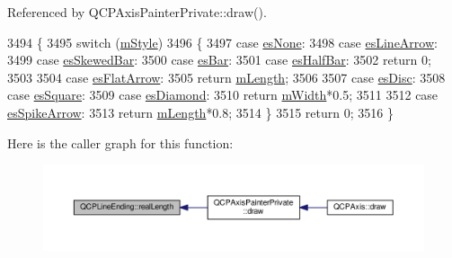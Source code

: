 Referenced by Q\+C\+P\+Axis\+Painter\+Private\+::draw().


\begin{DoxyCode}
3494 \{
3495   \textcolor{keywordflow}{switch} (\hyperlink{class_q_c_p_line_ending_a4696fc9117b60f1ca7690fcd2ba56611}{mStyle})
3496   \{
3497     \textcolor{keywordflow}{case} \hyperlink{class_q_c_p_line_ending_a5ef16e6876b4b74959c7261d8d4c2cd5aca12d500f50cd6871766801bac30fb03}{esNone}:
3498     \textcolor{keywordflow}{case} \hyperlink{class_q_c_p_line_ending_a5ef16e6876b4b74959c7261d8d4c2cd5a61f78ee8f375fb21cb9d250687bbcbd2}{esLineArrow}:
3499     \textcolor{keywordflow}{case} \hyperlink{class_q_c_p_line_ending_a5ef16e6876b4b74959c7261d8d4c2cd5a2b2cc96e757ca9bcd91fb70221ed43ab}{esSkewedBar}:
3500     \textcolor{keywordflow}{case} \hyperlink{class_q_c_p_line_ending_a5ef16e6876b4b74959c7261d8d4c2cd5a2cf543bbca332df26d89bf779f50469f}{esBar}:
3501     \textcolor{keywordflow}{case} \hyperlink{class_q_c_p_line_ending_a5ef16e6876b4b74959c7261d8d4c2cd5a126c390f0c359fcd8df1fc5e38d26d5b}{esHalfBar}:
3502       \textcolor{keywordflow}{return} 0;
3503       
3504     \textcolor{keywordflow}{case} \hyperlink{class_q_c_p_line_ending_a5ef16e6876b4b74959c7261d8d4c2cd5a3d7dcea2f100671727c3417142154f8f}{esFlatArrow}:
3505       \textcolor{keywordflow}{return} \hyperlink{class_q_c_p_line_ending_ae8e1e2566b96c05736cd92662dba8af8}{mLength};
3506       
3507     \textcolor{keywordflow}{case} \hyperlink{class_q_c_p_line_ending_a5ef16e6876b4b74959c7261d8d4c2cd5ae5a3414916817258bcc6dddd605e8f5c}{esDisc}:
3508     \textcolor{keywordflow}{case} \hyperlink{class_q_c_p_line_ending_a5ef16e6876b4b74959c7261d8d4c2cd5ae1836502fa43d8990bb62b2d493a140a}{esSquare}:
3509     \textcolor{keywordflow}{case} \hyperlink{class_q_c_p_line_ending_a5ef16e6876b4b74959c7261d8d4c2cd5a378fe5a8b768411b0bc1765210fe7200}{esDiamond}:
3510       \textcolor{keywordflow}{return} \hyperlink{class_q_c_p_line_ending_aca89d21341133c20dc6825c33a5eac48}{mWidth}*0.5;
3511       
3512     \textcolor{keywordflow}{case} \hyperlink{class_q_c_p_line_ending_a5ef16e6876b4b74959c7261d8d4c2cd5ab9964d0d03f812d1e79de15edbeb2cbf}{esSpikeArrow}:
3513       \textcolor{keywordflow}{return} \hyperlink{class_q_c_p_line_ending_ae8e1e2566b96c05736cd92662dba8af8}{mLength}*0.8;
3514   \}
3515   \textcolor{keywordflow}{return} 0;
3516 \}
\end{DoxyCode}


Here is the caller graph for this function\+:\nopagebreak
\begin{figure}[H]
\begin{center}
\leavevmode
\includegraphics[width=350pt]{class_q_c_p_line_ending_a6a528e6dc5aabe1077a573b045715f03_icgraph}
\end{center}
\end{figure}


